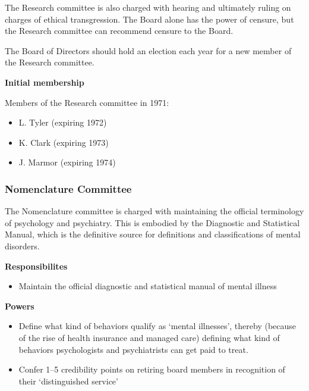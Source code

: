 \begin{refsection}
The Research committee is also charged with hearing and ultimately ruling on charges of ethical transgression. The Board alone has the power of censure, but the Research committee can recommend censure to the Board. 

The Board of Directors should hold an election each year for a new member of the Research committee. 

\textbf{Initial membership}

Members of the Research committee in 1971:

\begin{itemize}
\item L. Tyler (expiring 1972)

\item K. Clark (expiring 1973)

\item J. Marmor (expiring 1974)

\end{itemize}

\newpage

\subsubsection{Nomenclature Committee}
\label{nomenclaturecommittee}

The Nomenclature committee is charged with maintaining the official terminology of psychology and psychiatry. This is embodied by the Diagnostic and Statistical Manual, which is the definitive source for definitions and classifications of mental disorders. 

\textbf{Responsibilites}

\begin{itemize}
\item Maintain the official diagnostic and statistical manual of mental illness

\end{itemize}

\textbf{Powers}

\begin{itemize}
\item Define what kind of behaviors qualify as ‘mental illnesses’, thereby (because of the rise of health insurance and managed care) defining what kind of behaviors psychologists and psychiatrists can get paid to treat.

\item Confer 1--5 credibility points on retiring board members in recognition of their ‘distinguished service’


\end{itemize}
\end{refsection}

